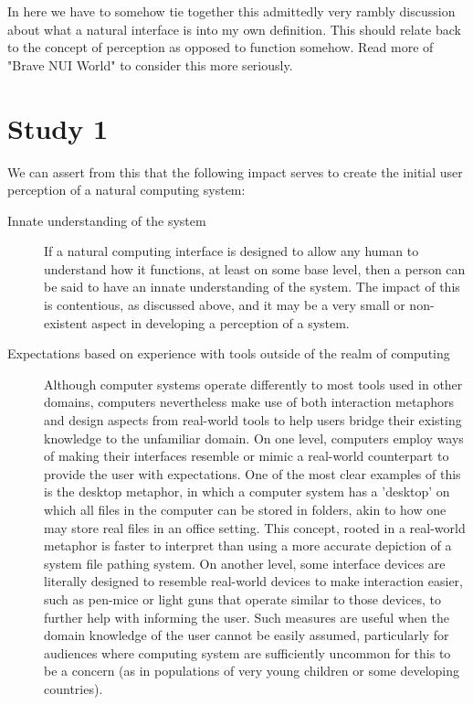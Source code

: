 \begin{todoenv}
In here we have to somehow tie together this admittedly very rambly discussion about what a natural interface is into my own definition. This should relate back to the concept of perception as opposed to function somehow. Read more of "Brave NUI World" to consider this more seriously.
\end{todoenv}

\section{Study 1}

We can assert from this that the following impact serves to create the initial user perception of a natural computing system:

\begin{description}

\item [Innate understanding of the system] If a natural computing interface is designed to allow any human to understand how it functions, at least on some base level, then a person can be said to have an innate understanding of the system. The impact of this is contentious, as discussed above, and it may be a very small or non-existent aspect in developing a perception of a system. 

\item [Expectations based on experience with tools outside of the realm of computing] Although computer systems operate differently to most tools used in other domains, computers nevertheless make use of both interaction metaphors and design aspects from real-world tools to help users bridge their existing knowledge to the unfamiliar domain. On one level, computers employ ways of making their interfaces resemble or mimic a real-world counterpart to provide the user with expectations. One of the most clear examples of this is the desktop metaphor, in which a computer system has a 'desktop' on which all files in the computer can be stored in folders, akin to how one may store real files in an office setting. This concept, rooted in a real-world metaphor is faster to interpret than using a more accurate depiction of a system file pathing system. On another level, some interface devices are literally designed to resemble real-world devices to make interaction easier, such as pen-mice or light guns that operate similar to those devices, to further help with informing the user. Such measures are useful when the domain knowledge of the user cannot be easily assumed, particularly for audiences where computing system are sufficiently uncommon for this to be a concern (as in populations of very young children or some developing countries). 


\end{description}
